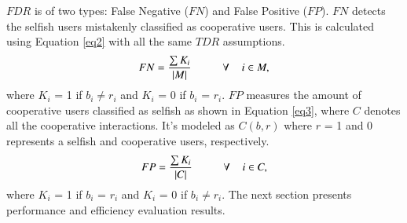 $FDR$ is of two types: False Negative ($FN$) and False Positive ($FP$). $FN$ detects the selfish users mistakenly classified as cooperative users. This is calculated using Equation \ref{eq2} with all the same $TDR$ assumptions.
\begin{equation}\label{eq2}
FN = \frac{\sum K_i}{|M|}\hspace{1cm} \forall \hspace{0.4cm}i \in M,
\end{equation}
where $K_i$ = 1 if $b_i \neq r_i$ and $K_i$ = 0 if $b_i$ = $r_i$. $FP$ measures the amount of cooperative users classified as selfish as shown in Equation \ref{eq3}, where $C$ denotes all the cooperative interactions. It's modeled as $C(b, r)$ where $r$ = 1 and 0 represents a selfish and cooperative users, respectively.
\begin{equation}\label{eq3}
FP = \frac{\sum K_i}{|C|}\hspace{1cm}\forall \hspace{0.4cm}i \in C,
\end{equation}
where $K_i$ = 1 if $b_i$ = $r_i$ and $K_i$ = 0 if $b_i \neq r_i$. The next section presents performance and efficiency evaluation results.


